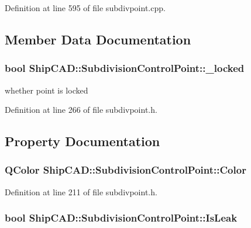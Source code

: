 Definition at line 595 of file subdivpoint.\-cpp.



\subsection{Member Data Documentation}
\hypertarget{classShipCAD_1_1SubdivisionControlPoint_acf4dc0c2a3d4c52847c68a8a412669f5}{
\subsubsection[{\-\_\-locked}]{\setlength{\rightskip}{0pt plus 5cm}bool Ship\-C\-A\-D\-::\-Subdivision\-Control\-Point\-::\-\_\-locked\hspace{0.3cm}{\ttfamily [protected]}}}\label{classShipCAD_1_1SubdivisionControlPoint_acf4dc0c2a3d4c52847c68a8a412669f5}
whether point is locked 

Definition at line 266 of file subdivpoint.\-h.



\subsection{Property Documentation}
\hypertarget{classShipCAD_1_1SubdivisionControlPoint_a8c7a97ce5194163f37a4b655f87bc309}{
\subsubsection[{Color}]{\setlength{\rightskip}{0pt plus 5cm}Q\-Color Ship\-C\-A\-D\-::\-Subdivision\-Control\-Point\-::\-Color\hspace{0.3cm}{\ttfamily [read]}}}\label{classShipCAD_1_1SubdivisionControlPoint_a8c7a97ce5194163f37a4b655f87bc309}


Definition at line 211 of file subdivpoint.\-h.

\hypertarget{classShipCAD_1_1SubdivisionControlPoint_a33a15d8a83f43369313d57a854046ff7}{
\subsubsection[{Is\-Leak}]{\setlength{\rightskip}{0pt plus 5cm}bool Ship\-C\-A\-D\-::\-Subdivision\-Control\-Point\-::\-Is\-Leak\hspace{0.3cm}{\ttfamily [read]}}}\label{classShipCAD_1_1SubdivisionControlPoint_a33a15d8a83f43369313d57a854046ff7}


